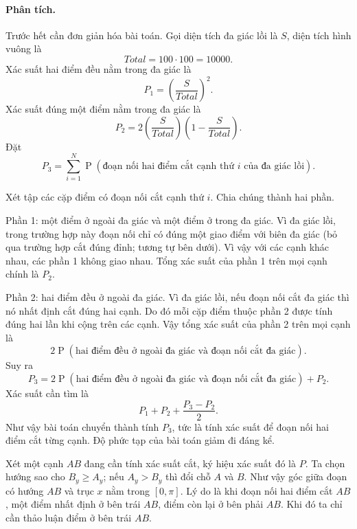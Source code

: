 \documentclass[11pt]{article}
\newcommand{\Prob}{\operatorname{P}}
\newcommand{\Total}{\mathit{Total}}
\begin{document}
\paragraph{Phân tích.}
Trước hết cần đơn giản hóa bài toán. Gọi diện tích đa giác lồi là \(S\), diện
tích hình vuông là
\[
  \Total=100\cdot100=10000.
\]
Xác suất hai điểm đều nằm trong đa giác là
\[
  P_1=\left(\frac{S}{\Total}\right)^2.
\]
Xác suất đúng một điểm nằm trong đa giác là
\[
  P_2=2\left(\frac{S}{\Total}\right)\left(1-\frac{S}{\Total}\right).
\]
Đặt
\[
  P_3=\sum_{i=1}^{N}
  \Prob(\text{đoạn nối hai điểm cắt cạnh thứ } i \text{ của đa giác lồi}).
\]

Xét tập các cặp điểm có đoạn nối cắt cạnh thứ \(i\). Chia chúng thành hai
phần.

Phần 1: một điểm ở ngoài đa giác và một điểm ở trong đa giác. Vì đa giác lồi,
trong trường hợp này đoạn nối chỉ có đúng một giao điểm với biên đa giác
(bỏ qua trường hợp cắt đúng đỉnh; tương tự bên dưới). Vì vậy với các cạnh
khác nhau, các phần 1 không giao nhau. Tổng xác suất của phần 1 trên mọi cạnh
chính là \(P_2\).

Phần 2: hai điểm đều ở ngoài đa giác. Vì đa giác lồi, nếu đoạn nối cắt đa giác
thì nó nhất định cắt đúng hai cạnh. Do đó mỗi cặp điểm thuộc phần 2 được tính
đúng hai lần khi cộng trên các cạnh. Vậy tổng xác suất của phần 2 trên mọi
cạnh là
\[
  2\Prob(\text{hai điểm đều ở ngoài đa giác và đoạn nối cắt đa giác}).
\]
Suy ra
\[
  P_3=
  2\Prob(\text{hai điểm đều ở ngoài đa giác và đoạn nối cắt đa giác})+P_2.
\]
Xác suất cần tìm là
\[
  P_1+P_2+\frac{P_3-P_2}{2}.
\]
Như vậy bài toán chuyển thành tính \(P_3\), tức là tính xác suất để đoạn nối
hai điểm cắt từng cạnh. Độ phức tạp của bài toán giảm đi đáng kể.

Xét một cạnh \(AB\) đang cần tính xác suất cắt, ký hiệu xác suất đó là \(P\).
Ta chọn hướng sao cho \(B_y\ge A_y\); nếu \(A_y>B_y\) thì đổi chỗ \(A\) và
\(B\). Như vậy góc giữa đoạn có hướng \(AB\) và trục \(x\) nằm trong
\([0,\pi]\). Lý do là khi đoạn nối hai điểm cắt \(AB\), một điểm nhất định ở
bên trái \(AB\), điểm còn lại ở bên phải \(AB\). Khi đó ta chỉ cần thảo luận
điểm ở bên trái \(AB\).

\begin{center}
\end{center}
\end{document}
